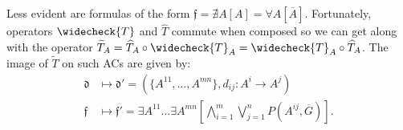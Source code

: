 \documentclass{fundam}
\begin{document}
Less evident are formulas of the form $\mathfrak{f} = \nexists A [A] =
\forall A [ \overline{A} ]$. Fortunately, operators $\widecheck{T}$
and $\widehat{T}$ commute when composed so we can get along with the
operator $\widetilde{T}_A = \widehat{T}_A \circ \widecheck{T}_A =
\widecheck{T}_A \circ \widehat{T}_A$. The image of $\widetilde{T}$ on
such ACs are given by:
\begin{align}
  \label{eq:nac}
  \mathfrak{d} & \longmapsto \mathfrak{d}' = \left(\{ A^{11}, \ldots,
    A^{mn} \}, d_{ij}:A^i \rightarrow A^j \right) \nonumber \\
  \mathfrak{f} & \longmapsto \mathfrak{f}' = \exists A^{11} \ldots
  \exists A^{mn} \left[ \bigwedge^{m}_{i=1}\bigvee_{j=1}^n P \left(
      A^{ij}, \overline{G} \right) \right].
\end{align}
\end{document}

